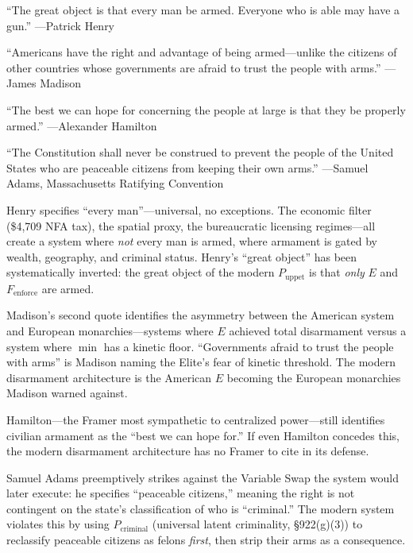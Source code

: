 \begin{historicalsource}
``The great object is that every man be armed. Everyone who is able may have a gun.'' \hfill ---Patrick Henry

\medskip
``Americans have the right and advantage of being armed---unlike the citizens of other countries whose governments are afraid to trust the people with arms.'' \hfill ---James Madison

\medskip
``The best we can hope for concerning the people at large is that they be properly armed.'' \hfill ---Alexander Hamilton

\medskip
``The Constitution shall never be construed to prevent the people of the United States who are peaceable citizens from keeping their own arms.'' \hfill ---Samuel Adams, Massachusetts Ratifying Convention
\end{historicalsource}

Henry specifies ``every man''---universal, no exceptions. The economic filter (\$4,709 NFA tax), the spatial proxy, the bureaucratic licensing regimes---all create a system where \textit{not} every man is armed, where armament is gated by wealth, geography, and criminal status. Henry's ``great object'' has been systematically inverted: the great object of the modern $P_{\text{uppet}}$ is that \textit{only} $E$ and $F_{\text{enforce}}$ are armed.

Madison's second quote identifies the asymmetry between the American system and European monarchies---systems where $E$ achieved total disarmament versus a system where $\min$ has a kinetic floor. ``Governments afraid to trust the people with arms'' is Madison naming the Elite's fear of kinetic threshold. The modern disarmament architecture is the American $E$ becoming the European monarchies Madison warned against.

Hamilton---the Framer most sympathetic to centralized power---still identifies civilian armament as the ``best we can hope for.'' If even Hamilton concedes this, the modern disarmament architecture has no Framer to cite in its defense.

Samuel Adams preemptively strikes against the Variable Swap the system would later execute: he specifies ``peaceable citizens,'' meaning the right is not contingent on the state's classification of who is ``criminal.'' The modern system violates this by using $P_{\text{criminal}}$ (universal latent criminality, \S922(g)(3)) to reclassify peaceable citizens as felons \textit{first}, then strip their arms as a consequence.

